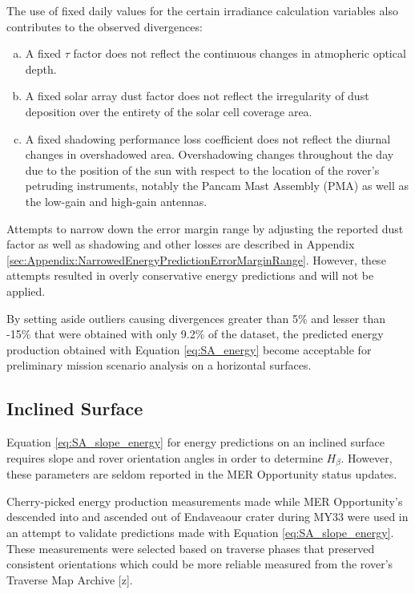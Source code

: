 
The use of fixed daily values for the certain irradiance calculation variables also contributes to the observed divergences:
\begin{enumerate}[(a)]
  \item A fixed $\tau$ factor does not reflect the continuous changes in atmopheric optical depth.
  \item A fixed solar array dust factor does not reflect the irregularity of dust deposition over the entirety of the solar cell coverage area.
  \item A fixed shadowing performance loss coefficient does not reflect the diurnal changes in overshadowed area. Overshadowing changes throughout the day due to the position of the sun with respect to the location of the rover's petruding instruments, notably the Pancam Mast Assembly (PMA) as well as the low-gain and high-gain antennas.
\end{enumerate}

Attempts to narrow down the error margin range by adjusting the reported dust factor as well as shadowing and other losses are described in Appendix \ref{sec:Appendix:NarrowedEnergyPredictionErrorMarginRange}. However, these attempts resulted in overly conservative energy predictions and will not be applied.

By setting aside outliers causing divergences greater than 5\% and lesser than -15\% that were obtained with only 9.2\% of the dataset, the predicted energy production obtained with Equation \ref{eq:SA_energy} become acceptable for preliminary mission scenario analysis on a horizontal surfaces.

\clearpage
\subsection{Inclined Surface}
\label{sec:PowerAndEnergyPredictions:Validation:InclinedSurface}

Equation \ref{eq:SA_slope_energy} for energy predictions on an inclined surface requires slope and rover orientation angles in order to determine $H_{\beta}$. However, these parameters are seldom reported in the \ac{MER} Opportunity status updates.

Cherry-picked energy production measurements made while \ac{MER} Opportunity's descended into and ascended out of Endaveaour crater during MY33 were used in an attempt to validate predictions made with Equation \ref{eq:SA_slope_energy}. These measurements were selected based on traverse phases that preserved consistent orientations which could be more reliable measured from the rover's Traverse Map Archive [z].

